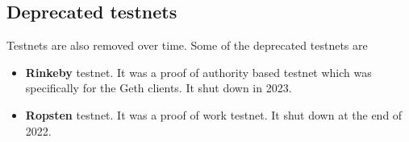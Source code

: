 \subsection{Deprecated testnets}\label{deprecated-testnets}

Testnets are also removed over time. Some of the deprecated testnets are

\begin{itemize}
\tightlist
\item
  \textbf{Rinkeby} testnet. It was a proof of authority based testnet
  which was specifically for the Geth clients. It shut down in 2023.
\item
  \textbf{Ropsten} testnet. It was a proof of work testnet. It shut down
  at the end of 2022.
\end{itemize}
